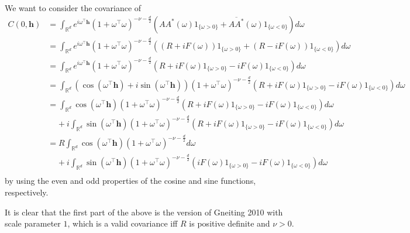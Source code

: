 \documentclass[11pt]{article}
\begin{document}
We want to consider the covariance of \begin{align*}
C(0, \boldsymbol{h}) &= \int_{\mathbb{R}^d} e^{i \omega^\top \boldsymbol{h}} (1 + \omega^\top \omega)^{-\nu- \frac{d}{2}} \left(AA^* (\omega)1_{\{\omega > 0\}} + \overline{AA^*}(\omega) 1_{\{\omega < 0\}}\right) d\omega \\
&=\int_{\mathbb{R}^d} e^{i \omega^\top \boldsymbol{h}}(1 + \omega^\top \omega)^{-\nu- \frac{d}{2}} \left((R + iF(\omega))1_{\{\omega > 0\}} + (R - iF(\omega)) 1_{\{\omega < 0\}}\right) d\omega \\
&=\int_{\mathbb{R}^d} e^{i \omega^\top \boldsymbol{h}}(1 + \omega^\top \omega)^{-\nu- \frac{d}{2}} \left(R + iF(\omega)1_{\{\omega > 0\}}  - iF(\omega)1_{\{\omega < 0\}}\right) d\omega \\
&=\int_{\mathbb{R}^d} (\cos(\omega^\top \boldsymbol{h}) + i\sin(\omega^\top \boldsymbol{h}))(1 + \omega^\top \omega)^{-\nu- \frac{d}{2}} \left(R + iF(\omega)1_{\{\omega > 0\}}  - iF(\omega)1_{\{\omega < 0\}}\right) d\omega \\
&=\int_{\mathbb{R}^d}\cos(\omega^\top \boldsymbol{h})(1 + \omega^\top \omega)^{-\nu- \frac{d}{2}} \left(R + iF(\omega)1_{\{\omega > 0\}}  - iF(\omega)1_{\{\omega < 0\}}\right) d\omega \\
& \ \ \ \ \ + i\int_{\mathbb{R}^d}\sin(\omega^\top \boldsymbol{h})(1 + \omega^\top \omega)^{-\nu- \frac{d}{2}} \left(R + iF(\omega)1_{\{\omega > 0\}}  - iF(\omega)1_{\{\omega < 0\}}\right) d\omega \\
&=R\int_{\mathbb{R}^d}\cos(\omega^\top \boldsymbol{h})(1 + \omega^\top \omega)^{-\nu- \frac{d}{2}} d\omega \\
& \ \ \ \ \ + i\int_{\mathbb{R}^d}\sin(\omega^\top \boldsymbol{h})(1 + \omega^\top \omega)^{-\nu- \frac{d}{2}} \left(iF(\omega)1_{\{\omega > 0\}}  - iF(\omega)1_{\{\omega < 0\}}\right) d\omega \\
\end{align*}by using the even and odd properties of the cosine and sine functions, respectively.

It is clear that the first part of the above is the version of Gneiting 2010 with scale parameter $1$, which is a valid covariance iff $R$ is positive definite and $\nu > 0$.
\end{document}
